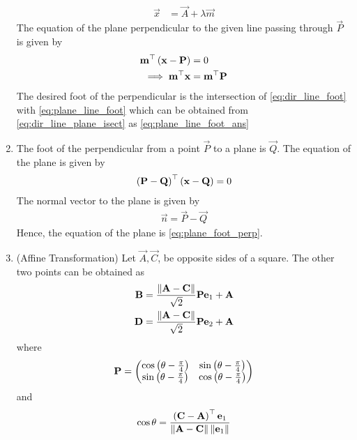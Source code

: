 \documentclass[journal,12pt,twocolumn]{IEEEtran}
\renewcommand\thesection{\arabic{section}}
\renewcommand\thesubsection{\thesection.\arabic{subsection}}
\begin{document}
\begin{enumerate}[label=\thesubsection.\arabic*.,ref=\thesubsection.\theenumi]
\begin{align}
	\label{eq:dir_line_foot}
	\vec{x} &= \vec{A} + \lambda \vec{m}
\end{align}
	The equation of the plane perpendicular to the given line passing through $\vec{P}$ is given by
\begin{align}
	\label{eq:plane_line_foot}
	\mathbf{m}^{\top}\left(\mathbf{x}-\mathbf{P}\right)  &= 0
	\\
	\implies \mathbf{m}^{\top}\mathbf{x}  &= \mathbf{m}^{\top}\mathbf{P}
\end{align}
The desired foot of the perpendicular is the intersection of 
	\eqref{eq:dir_line_foot} with 
	\eqref{eq:plane_line_foot}
	which can be obtained from 
	\eqref{eq:dir_line_plane_isect}
	as 
	\eqref{eq:plane_line_foot_ans}
\item The foot of the perpendicular from a point $\vec{P}$ to a plane is $\vec{Q}$.  The equation of the plane is given by 
\begin{align}
	\label{eq:plane_foot_perp}
	\left(\mathbf{P}-\mathbf{Q}\right)^{\top}\left(\mathbf{x}-\mathbf{Q}\right) = 0
\end{align}
	\solution  The normal vector to the plane is given by 
\begin{align}
	\vec{n}= \vec{P}-\vec{Q} 
\end{align}
	Hence, the equation of the plane is
	\eqref{eq:plane_foot_perp}.
	
%
\item (Affine Transformation) Let $\vec{A},\vec{C}$, be opposite sides of a square. The other two points can be obtained as  
\begin{align}
  \label{eq:square_points}
  \mathbf{B} = \frac{\left\lVert\mathbf{A}-\mathbf{C}\right\rVert}{\sqrt{2}} \mathbf{P}\mathbf{e}_1+\mathbf{A}
  \\
  \mathbf{D} = \frac{\left\lVert\mathbf{A}-\mathbf{C}\right\rVert}{\sqrt{2}} \mathbf{P}\mathbf{e}_2+\mathbf{A}
\end{align}
where 
\begin{align}
	\mathbf{P} = \begin{pmatrix}\cos \left(\theta-\frac{\pi}{4}\right) & \sin  \left(\theta-\frac{\pi}{4}\right) \\ \sin \left(\theta-\frac{\pi}{4}\right) & \cos \left(\theta-\frac{\pi}{4}\right)\end{pmatrix}
\end{align}
and 
\begin{align}
	\cos\theta = \frac{\left(\mathbf{C}-\mathbf{A}\right)^{\top}\mathbf{e}_1}{\left\lVert\mathbf{A}-\mathbf{C}\right\rVert\left\lVert\mathbf{e}_1\right\rVert}
\end{align}
\end{enumerate}
\end{document}
